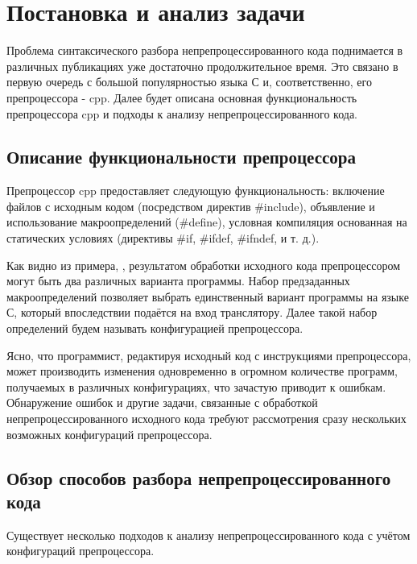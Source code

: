 \clearpage

\section{Постановка и анализ задачи}

Проблема синтаксического разбора непрепроцессированного кода поднимается в различных публикациях уже достаточно продолжительное время. Это связано в первую очередь с большой популярностью языка С и, соответственно, его препроцессора - cpp. Далее будет описана основная функциональность препроцессора cpp и подходы к анализу непрепроцессированного кода.

\subsection{Описание функциональности препроцессора}

Препроцессор cpp предоставляет следующую функциональность: включение файлов с исходным кодом (посредством директив \#include), объявление и использование макроопределений (\#define), условная компиляция основанная на статических условиях (директивы \#if, \#ifdef, \#ifndef, и т. д.).


Как видно из примера, , результатом обработки исходного кода препроцессором могут быть два различных варианта программы. Набор предзаданных макроопределений позволяет выбрать единственный вариант программы на языке С, который впоследствии подаётся на вход транслятору. Далее такой набор определений будем называть конфигурацией препроцессора.

Ясно, что программист, редактируя исходный код с инструкциями препроцессора, может производить изменения одновременно в огромном количестве программ, получаемых в различных конфигурациях, что зачастую приводит к ошибкам\cite{ribeiro}. Обнаружение ошибок и другие задачи, связанные с обработкой непрепроцессированного исходного кода требуют рассмотрения сразу нескольких возможных конфигураций препроцессора.

\subsection{Обзор способов разбора непрепроцессированного кода}

Существует несколько подходов к анализу непрепроцессированного кода с учётом конфигураций препроцессора.

